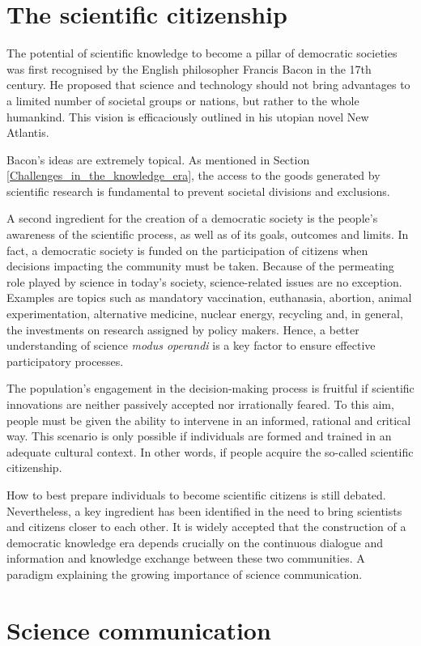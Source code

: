 \section{The scientific citizenship}
The potential of scientific knowledge to become a pillar of democratic societies was first recognised by the English philosopher Francis Bacon in the 17th century. He proposed that science and technology should not bring advantages to a limited number of societal groups or nations, but rather to the whole humankind. This vision is efficaciously outlined in his utopian novel New Atlantis.

Bacon's ideas are extremely topical. As mentioned in Section \ref{Challenges_in_the_knowledge_era}, the access to the goods generated by scientific research is fundamental to prevent societal divisions and exclusions.

A second ingredient for the creation of a democratic society is the people's awareness of the scientific process, as well as of its goals, outcomes and limits. In fact, a democratic society is funded on the participation of citizens when decisions impacting the community must be taken. Because of the permeating role played by science in today's society, science-related issues are no exception. Examples are topics such as mandatory vaccination, euthanasia, abortion, animal experimentation, alternative medicine, nuclear energy, recycling and, in general, the investments on research assigned by policy makers. Hence, a better understanding of science \textit{modus operandi} is a key factor to ensure effective participatory processes.    

The population's engagement in the decision-making process is fruitful if scientific innovations are neither passively accepted nor irrationally feared. To this aim, people must be given the ability to intervene in an informed, rational and critical way. This scenario is only possible if individuals are formed and trained in an adequate cultural context. In other words, if people acquire the so-called scientific citizenship.

How to best prepare individuals to become scientific citizens is still debated. Nevertheless, a key ingredient has been identified in the need to bring scientists and citizens closer to each other. It is widely accepted that the construction of a democratic knowledge era depends crucially on the continuous dialogue and information and knowledge exchange between these two communities. A paradigm explaining the growing importance of science communication.

\section{Science communication}    